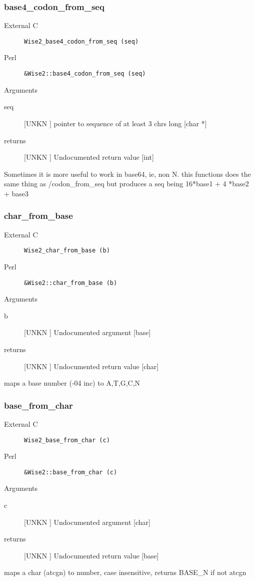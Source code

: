 \subsubsection{base4_codon_from_seq}
\begin{description}
\item[External C] {\tt Wise2_base4_codon_from_seq (seq)}
\item[Perl] {\tt &Wise2::base4_codon_from_seq (seq)}

\end{description}
Arguments
\begin{description}
\item[seq] [UNKN ] pointer to sequence of at least 3 chrs long [char *]
\item[returns] [UNKN ] Undocumented return value [int]
\end{description}
Sometimes it is more useful to work in base64, ie, 
non N. this functions does the same thing as 
/codon_from_seq but produces a seq being
16*base1 + 4 *base2 + base3


\subsubsection{char_from_base}
\begin{description}
\item[External C] {\tt Wise2_char_from_base (b)}
\item[Perl] {\tt &Wise2::char_from_base (b)}

\end{description}
Arguments
\begin{description}
\item[b] [UNKN ] Undocumented argument [base]
\item[returns] [UNKN ] Undocumented return value [char]
\end{description}
maps a base number (-04 inc) to A,T,G,C,N


\subsubsection{base_from_char}
\begin{description}
\item[External C] {\tt Wise2_base_from_char (c)}
\item[Perl] {\tt &Wise2::base_from_char (c)}

\end{description}
Arguments
\begin{description}
\item[c] [UNKN ] Undocumented argument [char]
\item[returns] [UNKN ] Undocumented return value [base]
\end{description}
maps a char (atcgn) to number, 
case insensitive, returns BASE_N
if not atcgn


